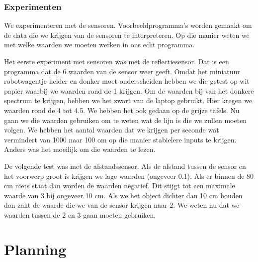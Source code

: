 \documentclass[a4paper,twoside,kulak]{kulakreport} %
\begin{document}
\subsubsection{Experimenten}

We experimenteren met de sensoren. Voorbeeldprogramma's worden gemaakt om de data die we krijgen van de sensoren te interpreteren. Op die manier weten we met welke waarden we moeten werken in ons echt programma. 

Het eerste experiment met sensoren was met de reflectiesensor. Dat is een programma dat de 6 waarden van de sensor weer geeft. Omdat het miniatuur robotwagentje helder en donker moet onderscheiden hebben we die getest op wit papier waarbij we waarden rond de 1 krijgen. Om de waarden bij van het donkere spectrum te krijgen, hebben we het zwart van de laptop gebruikt. Hier kregen we waarden rond de 4 tot 4.5. We hebben het ook gedaan op de grijze tafels.
Nu gaan we die waarden gebruiken om te weten wat de lijn is die we zullen moeten volgen.
We hebben het aantal waarden dat we krijgen per seconde wat vermindert van 1000 naar 100 om op die manier stabielere inputs te krijgen. Anders was het moeilijk om die waarden te lezen.


De volgende test was met de afstandssensor. Als de afstand tussen de sensor en het voorwerp groot is krijgen we lage waarden (ongeveer 0.1). Als er binnen de 80 cm niets staat dan worden de waarden negatief. Dit stijgt tot een maximale waarde van 3 bij ongeveer 10 cm. Als we het object dichter dan 10 cm houden dan zakt de waarde die we van de sensor krijgen naar 2. We weten nu dat we waarden tussen de 2 en 3 gaan moeten gebruiken. 

\section{Planning}



\end{document}
